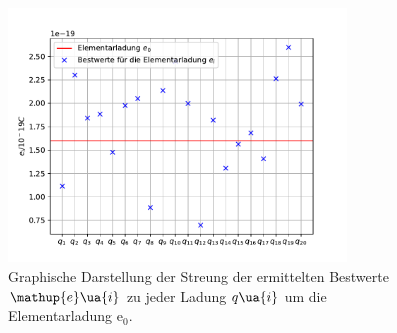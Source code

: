 
\begin{figure}[H]
  \centering
  \includegraphics[width = 0.8\textwidth]{../Messdaten/scattering.pdf}
  \caption{Graphische Darstellung der Streung der ermittelten Bestwerte $\mathup{e}\ua{i}$ zu jeder Ladung $q\ua{i}$ um die Elementarladung $\mathup{e}_0$.}
  \label{fig: streuung}
\end{figure}
